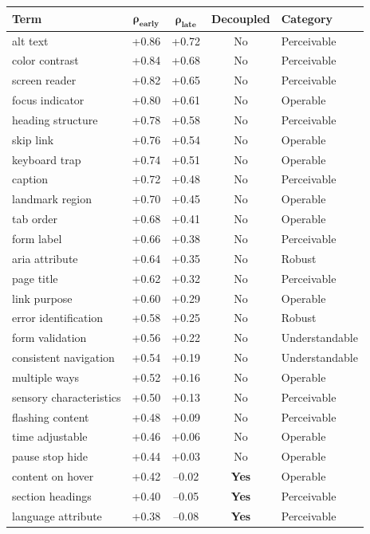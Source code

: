 \documentclass[10pt]{article} %
\begin{document}
\begin{table}[H]
\centering
\scriptsize
\begin{tabular}{|l|c|c|c|l|}
\hline
\textbf{Term} & $\mathbf{\rho_\text{early}}$ & $\mathbf{\rho_\text{late}}$ & \textbf{Decoupled} & \textbf{Category} \\
\hline
alt text & +0.86 & +0.72 & No & Perceivable \\
color contrast & +0.84 & +0.68 & No & Perceivable \\
screen reader & +0.82 & +0.65 & No & Perceivable \\
focus indicator & +0.80 & +0.61 & No & Operable \\
heading structure & +0.78 & +0.58 & No & Perceivable \\
skip link & +0.76 & +0.54 & No & Operable \\
keyboard trap & +0.74 & +0.51 & No & Operable \\
caption & +0.72 & +0.48 & No & Perceivable \\
landmark region & +0.70 & +0.45 & No & Operable \\
tab order & +0.68 & +0.41 & No & Operable \\
form label & +0.66 & +0.38 & No & Perceivable \\
aria attribute & +0.64 & +0.35 & No & Robust \\
page title & +0.62 & +0.32 & No & Perceivable \\
link purpose & +0.60 & +0.29 & No & Operable \\
error identification & +0.58 & +0.25 & No & Robust \\
form validation & +0.56 & +0.22 & No & Understandable \\
consistent navigation & +0.54 & +0.19 & No & Understandable \\
multiple ways & +0.52 & +0.16 & No & Operable \\
sensory characteristics & +0.50 & +0.13 & No & Perceivable \\
flashing content & +0.48 & +0.09 & No & Perceivable \\
time adjustable & +0.46 & +0.06 & No & Operable \\
pause stop hide & +0.44 & +0.03 & No & Operable \\
content on hover & +0.42 & --0.02 & \textbf{Yes} & Operable \\
section headings & +0.40 & --0.05 & \textbf{Yes} & Perceivable \\
language attribute & +0.38 & --0.08 & \textbf{Yes} & Perceivable \\

\end{tabular}
\end{table}
\end{document}
